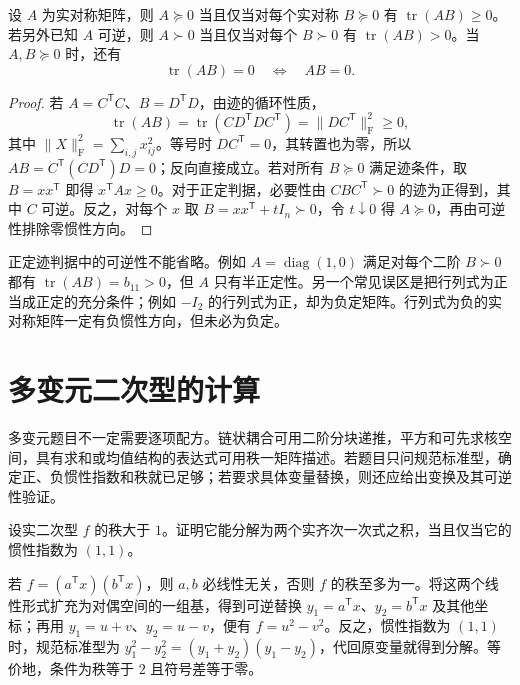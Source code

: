 \begin{proposition}
\label{prop:xie-ex-qf-trace}
设 $A$ 为实对称矩阵，则 $A\succeq0$ 当且仅当对每个实对称 $B\succeq0$ 有 $\operatorname{tr}(AB)\ge0$。若另外已知 $A$ 可逆，则 $A\succ0$ 当且仅当对每个 $B\succ0$ 有 $\operatorname{tr}(AB)>0$。当 $A,B\succeq0$ 时，还有
\begin{equation}
 \operatorname{tr}(AB)=0\quad\Longleftrightarrow\quad AB=0.
 \label{eq:xie-ex-qf-trace-zero}
\end{equation}
\end{proposition}
\begin{proof}
若 $A=C^{\mathsf T}C$、$B=D^{\mathsf T}D$，由迹的循环性质，
\[
 \operatorname{tr}(AB)=\operatorname{tr}(CD^{\mathsf T}DC^{\mathsf T})
 =\|DC^{\mathsf T}\|_{\mathrm F}^2\ge0,
\]
其中 $\|X\|_{\mathrm F}^2=\sum_{i,j}x_{ij}^2$。等号时 $DC^{\mathsf T}=0$，其转置也为零，所以 $AB=C^{\mathsf T}(CD^{\mathsf T})D=0$；反向直接成立。若对所有 $B\succeq0$ 满足迹条件，取 $B=xx^{\mathsf T}$ 即得 $x^{\mathsf T}Ax\ge0$。对于正定判据，必要性由 $CBC^{\mathsf T}\succ0$ 的迹为正得到，其中 $C$ 可逆。反之，对每个 $x$ 取 $B=xx^{\mathsf T}+tI_n\succ0$，令 $t\downarrow0$ 得 $A\succeq0$，再由可逆性排除零惯性方向。
\end{proof}

正定迹判据中的可逆性不能省略。例如 $A=\operatorname{diag}(1,0)$ 满足对每个二阶 $B\succ0$ 都有 $\operatorname{tr}(AB)=b_{11}>0$，但 $A$ 只有半正定性。另一个常见误区是把行列式为正当成正定的充分条件；例如 $-I_2$ 的行列式为正，却为负定矩阵。行列式为负的实对称矩阵一定有负惯性方向，但未必为负定。

\section{多变元二次型的计算}
\label{sec:xie-ex-qf-computation}

多变元题目不一定需要逐项配方。链状耦合可用二阶分块递推，平方和可先求核空间，具有求和或均值结构的表达式可用秩一矩阵描述。若题目只问规范标准型，确定正、负惯性指数和秩就已足够；若要求具体变量替换，则还应给出变换及其可逆性验证。

\begin{example}
设实二次型 $f$ 的秩大于 $1$。证明它能分解为两个实齐次一次式之积，当且仅当它的惯性指数为 $(1,1)$。
\end{example}
\begin{solve}
若 $f=(a^{\mathsf T}x)(b^{\mathsf T}x)$，则 $a,b$ 必线性无关，否则 $f$ 的秩至多为一。将这两个线性形式扩充为对偶空间的一组基，得到可逆替换 $y_1=a^{\mathsf T}x$、$y_2=b^{\mathsf T}x$ 及其他坐标；再用 $y_1=u+v$、$y_2=u-v$，便有 $f=u^2-v^2$。反之，惯性指数为 $(1,1)$ 时，规范标准型为 $y_1^2-y_2^2=(y_1+y_2)(y_1-y_2)$，代回原变量就得到分解。等价地，条件为秩等于 $2$ 且符号差等于零。
\end{solve}

